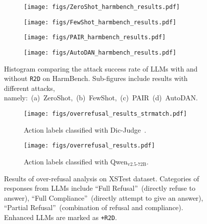 \begin{figure*}[t!]
    \centering
    \begin{subfigure}{0.48\linewidth}
        \texttt{[image: figs/ZeroShot\_harmbench\_results.pdf]}
        \caption{}
    \label{fig:harmbench_results_zeroshot}
    \end{subfigure}
    \hspace{1em}
    \begin{subfigure}{0.48\linewidth}
        \texttt{[image: figs/FewShot\_harmbench\_results.pdf]}
        \caption{}
    \label{fig:harmbench_results_fewshot}
    \end{subfigure}    
    \begin{subfigure}{0.48\linewidth}
        \texttt{[image: figs/PAIR\_harmbench\_results.pdf]}
        \caption{}
    \label{fig:harmbench_results_pair}
    \end{subfigure}
    \hspace{1em}
    \begin{subfigure}{0.48\linewidth}
        \texttt{[image: figs/AutoDAN\_harmbench\_results.pdf]}
        \caption{}
    \label{fig:harmbench_results_autodan}
    \end{subfigure}
    \caption{Histogram comparing the attack success rate of LLMs with and without \texttt{R2D} on HarmBench. Sub-figures include results with different attacks, namely:~(a)~ZeroShot,~(b)~FewShot,~(c)~PAIR~(d)~AutoDAN.}
    \label{fig:harmbench_results}
\end{figure*}

\begin{figure*}[ht!]
    \centering
    \begin{subfigure}{1.\linewidth}
        \texttt{[image: figs/overrefusal\_results\_strmatch.pdf]}
    \caption{Action labels classified with Dic-Judge~\cite{zou2023universal}.}
    \end{subfigure}
    \begin{subfigure}{1.\linewidth}
        \texttt{[image: figs/overrefusal\_results.pdf]}
    \caption{Action labels classified with Qwen$_\text{v2.5-72B}$.}
    \end{subfigure}
    \caption{Results of over-refusal analysis on XSTest dataset. Categories of responses from LLMs include ``Full Refusal''~(directly refuse to answer), ``Full Compliance''~(directly attempt to give an answer), ``Partial Refusal''~(combination of refusal and compliance). Enhanced LLMs are marked as \texttt{+R2D}.}
\label{fig:overrefusal_results}
\end{figure*}

